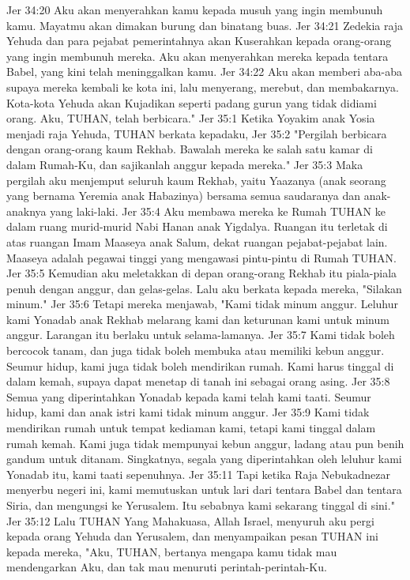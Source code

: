 Jer 34:20  Aku akan menyerahkan kamu kepada musuh yang ingin membunuh kamu. Mayatmu akan dimakan burung dan binatang buas.
Jer 34:21  Zedekia raja Yehuda dan para pejabat pemerintahnya akan Kuserahkan kepada orang-orang yang ingin membunuh mereka. Aku akan menyerahkan mereka kepada tentara Babel, yang kini telah meninggalkan kamu.
Jer 34:22  Aku akan memberi aba-aba supaya mereka kembali ke kota ini, lalu menyerang, merebut, dan membakarnya. Kota-kota Yehuda akan Kujadikan seperti padang gurun yang tidak didiami orang. Aku, TUHAN, telah berbicara."
Jer 35:1  Ketika Yoyakim anak Yosia menjadi raja Yehuda, TUHAN berkata kepadaku,
Jer 35:2  "Pergilah berbicara dengan orang-orang kaum Rekhab. Bawalah mereka ke salah satu kamar di dalam Rumah-Ku, dan sajikanlah anggur kepada mereka."
Jer 35:3  Maka pergilah aku menjemput seluruh kaum Rekhab, yaitu Yaazanya (anak seorang yang bernama Yeremia anak Habazinya) bersama semua saudaranya dan anak-anaknya yang laki-laki.
Jer 35:4  Aku membawa mereka ke Rumah TUHAN ke dalam ruang murid-murid Nabi Hanan anak Yigdalya. Ruangan itu terletak di atas ruangan Imam Maaseya anak Salum, dekat ruangan pejabat-pejabat lain. Maaseya adalah pegawai tinggi yang mengawasi pintu-pintu di Rumah TUHAN.
Jer 35:5  Kemudian aku meletakkan di depan orang-orang Rekhab itu piala-piala penuh dengan anggur, dan gelas-gelas. Lalu aku berkata kepada mereka, "Silakan minum."
Jer 35:6  Tetapi mereka menjawab, "Kami tidak minum anggur. Leluhur kami Yonadab anak Rekhab melarang kami dan keturunan kami untuk minum anggur. Larangan itu berlaku untuk selama-lamanya.
Jer 35:7  Kami tidak boleh bercocok tanam, dan juga tidak boleh membuka atau memiliki kebun anggur. Seumur hidup, kami juga tidak boleh mendirikan rumah. Kami harus tinggal di dalam kemah, supaya dapat menetap di tanah ini sebagai orang asing.
Jer 35:8  Semua yang diperintahkan Yonadab kepada kami telah kami taati. Seumur hidup, kami dan anak istri kami tidak minum anggur.
Jer 35:9  Kami tidak mendirikan rumah untuk tempat kediaman kami, tetapi kami tinggal dalam rumah kemah. Kami juga tidak mempunyai kebun anggur, ladang atau pun benih gandum untuk ditanam. Singkatnya, segala yang diperintahkan oleh leluhur kami Yonadab itu, kami taati sepenuhnya.
Jer 35:11  Tapi ketika Raja Nebukadnezar menyerbu negeri ini, kami memutuskan untuk lari dari tentara Babel dan tentara Siria, dan mengungsi ke Yerusalem. Itu sebabnya kami sekarang tinggal di sini."
Jer 35:12  Lalu TUHAN Yang Mahakuasa, Allah Israel, menyuruh aku pergi kepada orang Yehuda dan Yerusalem, dan menyampaikan pesan TUHAN ini kepada mereka, "Aku, TUHAN, bertanya mengapa kamu tidak mau mendengarkan Aku, dan tak mau menuruti perintah-perintah-Ku.
